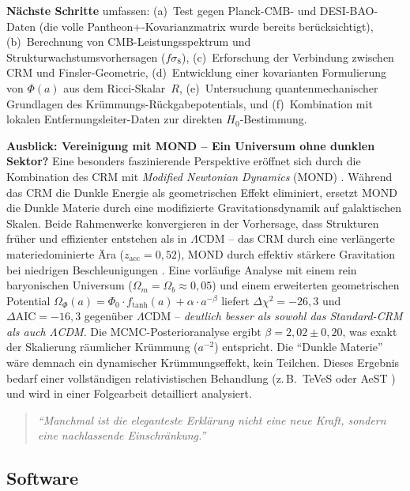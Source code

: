 \documentclass[aps,prd,twocolumn,superscriptaddress,nofootinbib]{revtex4-2}
\begin{document}
\textbf{Nächste Schritte} umfassen: (a)~Test gegen Planck-CMB- und DESI-BAO-Daten (die volle Pantheon+-Kovarianzmatrix wurde bereits berücksichtigt), (b)~Berechnung von CMB-Leistungsspektrum und Strukturwachstumsvorhersagen ($f\sigma_8$), (c)~Erforschung der Verbindung zwischen CRM und Finsler-Geometrie, (d)~Entwicklung einer kovarianten Formulierung von $\Phi(a)$ aus dem Ricci-Skalar~$R$, (e)~Untersuchung quantenmechanischer Grundlagen des Krümmungs-Rückgabepotentials, und (f)~Kombination mit lokalen Entfernungsleiter-Daten zur direkten $H_0$-Bestimmung.

\textbf{Ausblick: Vereinigung mit MOND -- Ein Universum ohne dunklen Sektor?} Eine besonders faszinierende Perspektive eröffnet sich durch die Kombination des CRM mit \textit{Modified Newtonian Dynamics} (MOND) \cite{Milgrom1983}. Während das CRM die Dunkle Energie als geometrischen Effekt eliminiert, ersetzt MOND die Dunkle Materie durch eine modifizierte Gravitationsdynamik auf galaktischen Skalen. Beide Rahmenwerke konvergieren in der Vorhersage, dass Strukturen früher und effizienter entstehen als in $\Lambda$CDM -- das CRM durch eine verlängerte materiedominierte Ära ($z_{\mathrm{acc}} = 0{,}52$), MOND durch effektiv stärkere Gravitation bei niedrigen Beschleunigungen \cite{Asencio2023}. Eine vorläufige Analyse mit einem rein baryonischen Universum ($\Omega_m = \Omega_b \approx 0{,}05$) und einem erweiterten geometrischen Potential $\Omega_\Phi(a) = \Phi_0 \cdot f_{\mathrm{tanh}}(a) + \alpha \cdot a^{-\beta}$ liefert $\Delta\chi^2 = -26{,}3$ und $\Delta\mathrm{AIC} = -16{,}3$ gegenüber $\Lambda$CDM -- \textit{deutlich besser als sowohl das Standard-CRM als auch $\Lambda$CDM}. Die MCMC-Posterioranalyse ergibt $\beta = 2{,}02 \pm 0{,}20$, was exakt der Skalierung räumlicher Krümmung ($a^{-2}$) entspricht. Die ``Dunkle Materie'' wäre demnach ein dynamischer Krümmungseffekt, kein Teilchen. Dieses Ergebnis bedarf einer vollständigen relativistischen Behandlung (z.\,B.\ TeVeS oder AeST \cite{Bekenstein2004,Skordis2021}) und wird in einer Folgearbeit detailliert analysiert.

\begin{quote}
\textit{``Manchmal ist die eleganteste Erklärung nicht eine neue Kraft, sondern eine nachlassende Einschränkung.''}
\end{quote}

\subsection*{Software}
\end{document}
